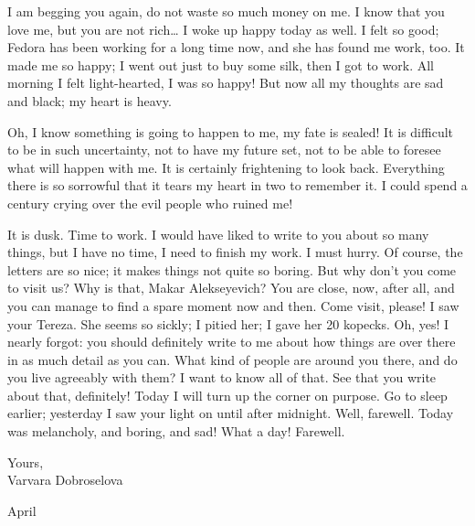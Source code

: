 I am begging you again, do not waste so much money on me. I know that you love me, but you are not rich\ldots{} I woke up happy today as well. I felt so good; Fedora has been working for a long time now, and she has found me work, too. It made me so happy; I went out just to buy some silk, then I got to work. All morning I felt light-hearted, I was so happy! But now all my thoughts are sad and black; my heart is heavy.

Oh, I know something is going to happen to me, my fate is sealed! It is difficult to be in such uncertainty, not to have my future set, not to be able to foresee what will happen with me. It is certainly frightening to look back. Everything there is so sorrowful that it tears my heart in two to remember it. I could spend a century crying over the evil people who ruined me!

It is dusk. Time to work. I would have liked to write to you about so many things, but I have no time, I need to finish my work. I must hurry. Of course, the letters are so nice; it makes things not quite so boring. But why don't you come to visit us? Why is that, Makar Alekseyevich? You are close, now, after all, and you can manage to find a spare moment now and then. Come visit, please! I saw your Tereza. She seems so sickly; I pitied her; I gave her 20 kopecks. Oh, yes! I nearly forgot: you should definitely write to me about how things are over there in as much detail as you can. What kind of people are around you there, and do you live agreeably with them? I want to know all of that. See that you write about that, definitely! Today I will turn up the corner on purpose. Go to sleep earlier; yesterday I saw your light on until after midnight. Well, farewell. Today was melancholy, and boring, and sad! What a day! Farewell.

\begin{flushright}
	Yours,\\
	Varvara Dobroselova
\end{flushright}

\begin{flushright}
	April 
\end{flushright}